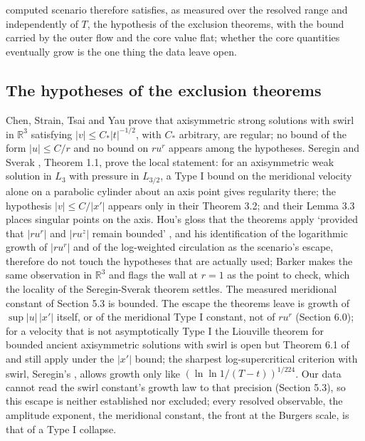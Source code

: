 \documentclass[11pt]{article}
\begin{document}
computed scenario therefore satisfies, as measured over the resolved range and independently of $T$, the hypothesis of the exclusion theorems, with the bound carried by the outer flow and the core value flat; whether the core quantities eventually grow is the one thing the data leave open.

\subsection{The hypotheses of the exclusion theorems}

Chen, Strain, Tsai and Yau \cite[II]{CSTY09} prove that axisymmetric strong solutions with swirl in $\mathbb{R}^3$ satisfying $|v| \le C_* |t|^{-1/2}$, with $C_*$ arbitrary, are regular; no bound of the form $|u| \le C / r$ and no bound on $r u^r$ appears among the hypotheses. Seregin and Sverak \cite{SS09}, Theorem 1.1, prove the local statement: for an axisymmetric weak solution in $L_3$ with pressure in $L_{3/2}$, a Type I bound on the meridional velocity alone on a parabolic cylinder about an axis point gives regularity there; the hypothesis $|v| \le C / |x'|$ appears only in their Theorem 3.2; and their Lemma 3.3 places singular points on the axis. Hou's gloss that the theorems apply `provided that $|r u^r|$ and $|r u^z|$ remain bounded' \cite[Sec. 1.5]{H24}, and his identification of the logarithmic growth of $|r u^r|$ and of the log-weighted circulation as the scenario's escape, therefore do not touch the hypotheses that are actually used; Barker \cite{B25} makes the same observation in $\mathbb{R}^3$ and flags the wall at $r = 1$ as the point to check, which the locality of the Seregin-Sverak theorem \cite{SS09} settles. The measured meridional constant of Section 5.3 is bounded. The escape the theorems leave is growth of $\sup |u|\,|x'|$ itself, or of the meridional Type I constant, not of $r u^r$ (Section 6.0); for a velocity that is not asymptotically Type I the Liouville theorem for bounded ancient axisymmetric solutions with swirl is open \cite{KNSS09,AB19} but Theorem 6.1 of \cite{KNSS09} and \cite{CSTY08} still apply under the $|x'|$ bound; the sharpest log-supercritical criterion with swirl, Seregin's \cite{S21}, allows growth only like $(\ln \ln 1/(T - t))^{1/224}$. Our data cannot read the swirl constant's growth law to that precision (Section 5.3), so this escape is neither established nor excluded; every resolved observable, the amplitude exponent, the meridional constant, the front at the Burgers scale, is that of a Type I collapse.
\end{document}
